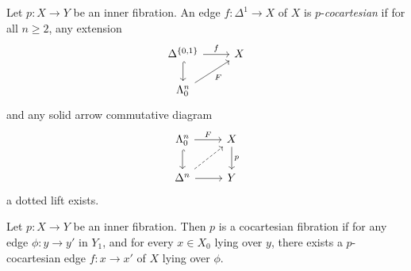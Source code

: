 \documentclass{MetricNotes2023}
\begin{document}
\begin{definition}
Let \(p : X \to Y\) be an inner fibration. An edge \(f : \Delta^1 \to X\) of \(X\) is \(p\)-\textit{cocartesian} if for all \(n \geq 2\), any extension 
\[\begin{tikzcd}
\Delta^{\{0, 1\}} \arrow[r, "f"] \arrow[d, hookrightarrow, swap, ""]  & X \\
\Lambda^n_0 \arrow[ur, swap, "F"]  & 
\end{tikzcd}\]
and any solid arrow commutative diagram
\[\begin{tikzcd}
\Lambda^n_0 \arrow[r, "F"] \arrow[d, hookrightarrow, swap, ""]  & X \arrow[d, "p"]  \\
\Delta^n \arrow[r, swap, ""] \arrow[ur, dashrightarrow, ""]  & Y
\end{tikzcd}\]
a dotted lift exists. 
\end{definition}

\begin{definition}
Let \(p : X \to Y\) be an inner fibration. Then \(p\) is a cocartesian fibration if for any edge \(\phi : y \to y'\) in \(Y_1\), and for every \(x \in X_0\) lying over \(y\), there exists a \(p\)-cocartesian edge \(f : x \to x'\) of \(X\) lying over \(\phi\). 
\end{definition}




\printbibliography
\end{document}
